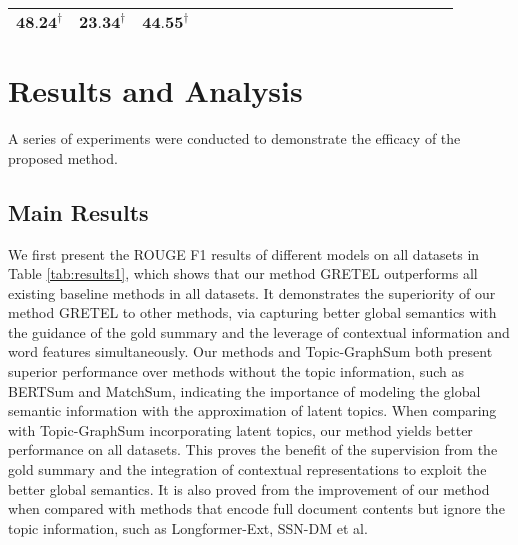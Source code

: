 \documentclass[11pt]{article}
\begin{document}
\begin{table*}[!hbt]
{\begin{tabular}{c|c|c|c|c|c|c|c|c|c|c|c|c|c|c|c|c|c|c}
    $\textbf{48.24}^\dagger$&$\textbf{23.34}^\dagger$&$\textbf{44.55}^\dagger$\\
    \hline
    \end{tabular}}
    \caption{ROUGE F1 results of different models on CNN/DM, Arxiv, PubMed-Long, PubMed-Short, CORD-19, and S2ORC under 5 times running. $\dagger$ means outperform the existing model with best performance significantly ($p < 0.05$). Part results are from~\cite{grail2021globalizing, zhong2020extractive, cui2021sliding}.}
    \label{tab:results1}
\end{table*}
\section{Results and Analysis}
A series of experiments were conducted to demonstrate the efficacy of the proposed method.

\subsection{Main Results}
We first present the ROUGE F1 results of different models on all datasets in Table \ref{tab:results1}, which shows that our method GRETEL outperforms all existing baseline methods in all datasets.
It demonstrates the superiority of our method GRETEL to other methods, via capturing better global semantics with the guidance of the gold summary and the leverage of contextual information and word features simultaneously.
Our methods and Topic-GraphSum both present superior performance over methods without the topic information, such as BERTSum and MatchSum, indicating the importance of modeling the global semantic information with the approximation of latent topics.
When comparing with Topic-GraphSum incorporating latent topics, our method yields better performance on all datasets.
This proves the benefit of the supervision from the gold summary and the integration of contextual representations to exploit the better global semantics.
It is also proved from the improvement of our method when compared with methods that encode full document contents but ignore the topic information, such as Longformer-Ext, SSN-DM et al.
\end{document}
